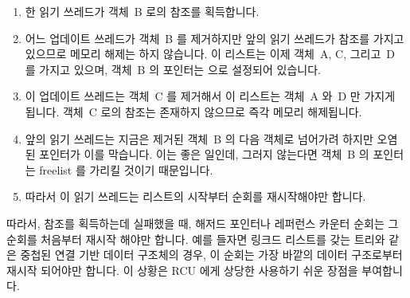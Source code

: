 \begin{enumerate}
\item	한 읽기 쓰레드가 객체~B 로의 참조를 획득합니다.
\item	어느 업데이트 쓰레드가 객체~B 를 제거하지만 앞의 읽기 쓰레드가 참조를
	가지고 있으므로 메모리 해제는 하지 않습니다.
	이 리스트는 이제 객체~A, C, 그리고~D 를 가지고 있으며, 객체~B 의
	 포인터는  으로 설정되어 있습니다.
\item	이 업데이트 쓰레드는 객체~C 를 제거해서 이 리스트는 객체~A 와~D 만
	가지게 됩니다.
	객체~C 로의 참조는 존재하지 않으므로 즉각 메모리 해제됩니다.
\item	앞의 읽기 쓰레드는 지금은 제거된 객체~B 의 다음 객체로 넘어가려 하지만
	오염된  포인터가 이를 막습니다.
	이는 좋은 일인데, 그러지 않는다면 객체~B 의  포인터는
	freelist 를 가리킬 것이기 때문입니다.
\item	따라서 이 읽기 쓰레드는 리스트의 시작부터 순회를 재시작해야만 합니다.

\iffalse

\item	A reader acquires a reference to object~B.
\item	An updater removes object~B, but refrains from freeing it because
	the reader holds a reference.
	The list now contains objects~A, C, and~D, and
	object~B's \co{->next} pointer is set to \co{HAZPTR_POISON}.
\item	The updater removes object~C, so that the list now contains
	objects~A and~D\@.
	Because there is no reference to object~C, it is immediately freed.
\item	The reader tries to advance to the successor of the object
	following the now-removed object~B, but the poisoned
	\co{->next} pointer prevents this.
	Which is a good thing, because object~B's \co{->next} pointer
	would otherwise point to the freelist.
\item	The reader must therefore restart its traversal from the head
	of the list.

\fi

\end{enumerate}

따라서, 참조를 획득하는데 실패했을 때, 해저드 포인터나 레퍼런스 카운터 순회는
그 순회를 처음부터 재시작 해야만 합니다.
예를 들자면 링크드 리스트를 갖는 트리와 같은 중첩된 연결 기반 데이터 구조체의
경우, 이 순회는 가장 바깥의 데이터 구조로부터 재시작 되어야만 합니다.
이 상황은 RCU 에게 상당한 사용하기 쉬운 장점을 부여합니다.

